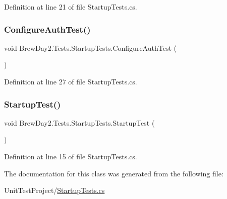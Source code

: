 Definition at line 21 of file Startup\+Tests.\+cs.

\mbox{\label{class_brew_day2_1_1_tests_1_1_startup_tests_a961c7db7ac851c97216d4acf025d5710}} 
\subsubsection{\texorpdfstring{Configure\+Auth\+Test()}{ConfigureAuthTest()}}
{\footnotesize\ttfamily void Brew\+Day2.\+Tests.\+Startup\+Tests.\+Configure\+Auth\+Test (\begin{DoxyParamCaption}{ }\end{DoxyParamCaption})}



Definition at line 27 of file Startup\+Tests.\+cs.

\mbox{\label{class_brew_day2_1_1_tests_1_1_startup_tests_a10fcf572a6ae9b2b0dc7149879aa44aa}} 
\subsubsection{\texorpdfstring{Startup\+Test()}{StartupTest()}}
{\footnotesize\ttfamily void Brew\+Day2.\+Tests.\+Startup\+Tests.\+Startup\+Test (\begin{DoxyParamCaption}{ }\end{DoxyParamCaption})}



Definition at line 15 of file Startup\+Tests.\+cs.



The documentation for this class was generated from the following file\+:\begin{DoxyCompactItemize}
\item 
Unit\+Test\+Project/\mbox{\hyperlink{_startup_tests_8cs}{Startup\+Tests.\+cs}}\end{DoxyCompactItemize}
